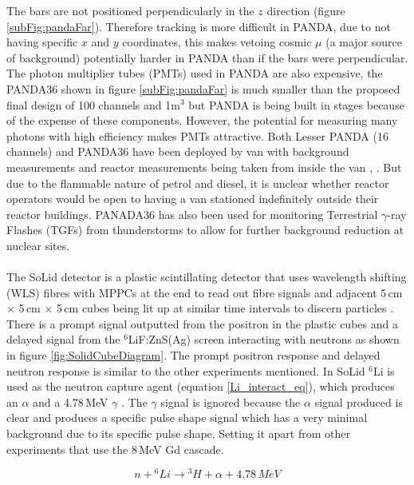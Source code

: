 The bars are not positioned perpendicularly in the $z$ direction (figure \ref{subFig:pandaFar}). Therefore tracking is more difficult in PANDA, due to not having specific $x$ and $y$ coordinates, this makes vetoing cosmic $\mu$ (a major source of background) potentially harder in PANDA than if the bars were perpendicular. The photon multiplier tubes (PMTs) used in PANDA are also expensive, the PANDA36 shown in figure \ref{subFig:pandaFar} is much smaller than the proposed final design of 100 channels and 1m$^3$ \cite{PANDA_2012} but PANDA is being built in stages because of the expense of these components. However, the potential for measuring many photons with high efficiency makes PMTs attractive. Both Lesser PANDA (16 channels) and PANDA36 have been deployed by van with background measurements and reactor measurements being taken from inside the van \cite{PANDA_2012}, \cite{PANDA_2014}. But due to the flammable nature of petrol and diesel, it is unclear whether reactor operators would be open to having a van stationed indefinitely outside their reactor buildings. PANADA36 has also been used for monitoring Terrestrial $\gamma$-ray Flashes (TGFs) from thunderstorms to allow for further background reduction at nuclear sites\cite{PANDA_tgf}. 
\\\\The SoLid detector is a plastic scintillating detector that uses wavelength shifting (WLS) fibres with MPPCs at the end to read out fibre signals and adjacent 5\,cm $\times$ 5\,cm $\times$ 5\,cm cubes being lit up at similar time intervals to discern particles \cite{Solid_proposal}. There is a prompt signal outputted from the positron in the plastic cubes and a delayed signal from the $^6$LiF:ZnS(Ag) screen interacting with neutrons as shown in figure \ref{fig:SolidCubeDiagram}. The prompt positron response and delayed neutron response is similar to the other experiments mentioned. In SoLid $^6$Li is used as the neutron capture agent (equation \ref{Li_interact_eq}), which produces an $\alpha$ and a 4.78\,MeV $\gamma$ \cite{Solid_readout}. The $\gamma$ signal is ignored because the $\alpha$ signal produced is clear and produces a specific pulse shape signal \cite{Solid_readout} which has a very minimal background due to its specific pulse shape. Setting it apart from other experiments that use the 8\,MeV Gd cascade. 

\begin{equation}
n + {^6Li} \rightarrow {^3H} + \alpha +4.78\,MeV
\label{Li_interact_eq}
\end{equation}

